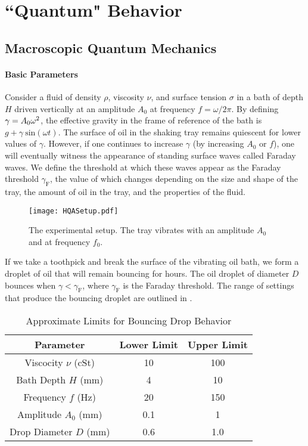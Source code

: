 \chapter{``Quantum" Behavior}
\label{Ch1}

\section{Macroscopic Quantum Mechanics} 
	    \subsubsection{Basic Parameters}
	    \label{parameters}
	       Consider a fluid of density $\rho$, viscosity $\nu$, and surface tension $\sigma$ in a bath of depth $H$ driven vertically at an amplitude $A_0$ at frequency $f=\omega/{2\pi}$. By defining $\mathnormal{\gamma}=A_0\omega^2$, the effective gravity in the frame of reference of the bath is $g+\gamma~\mathrm{sin}(\omega t)$. The surface of oil in the shaking tray remains quiescent for lower values of $\gamma$. However, if one continues to increase $\gamma$ (by increasing $A_0$ or $f$), one will eventually witness the appearance of standing surface waves called Faraday waves. We define the threshold at which these waves appear as the Faraday threshold $\gamma_\mathrm{F}$, the value of which changes depending on the size and shape of the tray, the amount of oil in the tray, and the properties of the fluid. 
	       
	   \begin{figure}[h]
	       \centering
	    \texttt{[image: HQASetup.pdf]}
	     \caption{The experimental setup. The tray vibrates with an amplitude $A_0$ and at frequency $f_0$.}
	 \label{regime}
	\end{figure}
	       
	    If we take a toothpick and break the surface of the vibrating oil bath, we form a droplet of oil that will remain bouncing for hours. The oil droplet of diameter $D$ bounces when $\gamma<\gamma_\mathrm{F}$, where $\gamma_\mathrm{F}$ is the Faraday threshold. The range of settings that produce the bouncing droplet are outlined in . 
	      
	       \begin{table}[htdp] 
\caption[Basic Table 1]{Approximate Limits for Bouncing Drop Behavior} 
\begin{center} 
\begin{tabular}{c c c} 
\toprule 
  Parameter &  Lower Limit & Upper Limit \\
  \midrule
Viscocity $\nu$ (cSt) & 10 & 100 \\ 
Bath Depth $H$ (mm) & 4 & 10 \\
Frequency $f$ (Hz) & 20 & 150 \\
Amplitude $A_0$ (mm) & 0.1 & 1 \\
Drop Diameter $D$ (mm) & 0.6 & 1.0 \\
\bottomrule 
\end{tabular}
\end{center}
\label{approxlimits} 
\end{table}	

